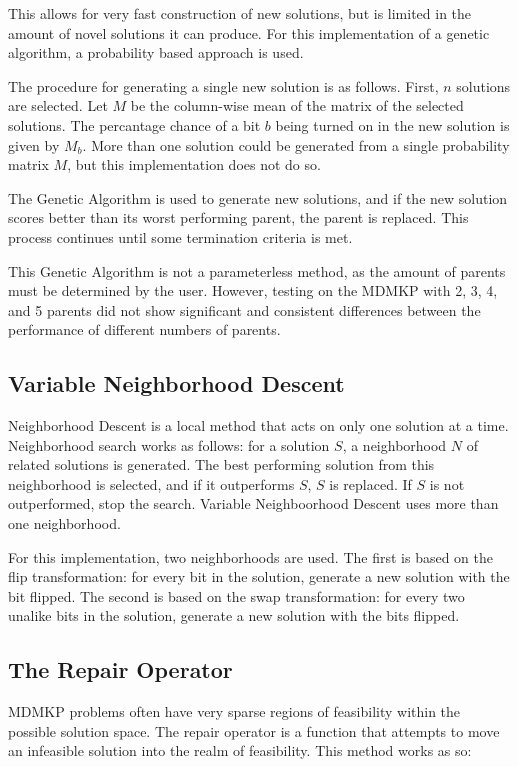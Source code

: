 \documentclass[11pt, letterpaper, onecolumn]{article}
\begin{document}
This allows for very fast construction of new solutions, but is limited in the amount of novel solutions it can produce. For this implementation of a genetic algorithm, a probability based approach is used. 

The procedure for generating a single new solution is as follows. First, $n$ solutions are selected. Let $M$ be the column-wise mean of the matrix of the selected solutions. The percantage chance of a bit $b$ being turned on in the new solution is given by $M_b$. More than one solution could be generated from a single probability matrix $M$, but this implementation does not do so. 

The Genetic Algorithm is used to generate new solutions, and if the new solution scores better than its worst performing parent, the parent is replaced. This process continues until some termination criteria is met. 

This Genetic Algorithm is not a parameterless method, as the amount of parents must be determined by the user. However, testing on the MDMKP with 2, 3, 4, and 5 parents did not show significant and consistent differences between the performance of different numbers of parents. 

\subsection{Variable Neighborhood Descent}

Neighborhood Descent is a local method that acts on only one solution at a time. Neighborhood search works as follows: for a solution $S$, a neighborhood $N$ of related solutions is generated. The best performing solution from this neighborhood is selected, and if it outperforms $S$, $S$ is replaced. If $S$ is not outperformed, stop the search. Variable Neighboorhood Descent uses more than one neighborhood. 

For this implementation, two neighborhoods are used. The first is based on the flip transformation: for every bit in the solution, generate a new solution with the bit flipped. The second is based on the swap transformation: for every two unalike bits in the solution, generate a new solution with the bits flipped.  

\subsection{The Repair Operator}

MDMKP problems often have very sparse regions of feasibility within the possible solution space. The repair operator is a function that attempts to move an infeasible solution into the realm of feasibility. This method works as so:  
\end{document}
